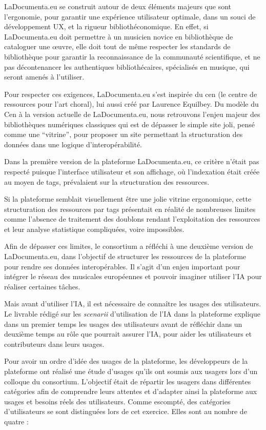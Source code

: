 LaDocumenta.eu se construit autour de deux éléments majeurs que sont l'ergonomie, pour garantir une expérience utilisateur optimale, dans un souci de développement UX, et la rigueur bibliothéconomique. En effet, si LaDocumenta.eu doit permettre à un musicien novice en bibliothèque de cataloguer une œuvre, elle doit tout de même respecter les standards de bibliothèque pour garantir la reconnaissance de la communauté scientifique, et ne pas décontenancer les authentiques bibliothécaires, spécialisés en musique, qui seront amenés à l'utiliser. 

Pour respecter ces exigences, LaDocumenta.eu s'est inspirée du cen (le centre de ressources  pour l'art choral), lui aussi créé par Laurence Equilbey.
Du modèle du Cen à la version actuelle de LaDocumenta.eu, nous retrouvons l'enjeu majeur des bibliothèques numériques classiques qui est de dépasser le simple site joli, pensé comme une \enquote{vitrine}, pour proposer un site permettant la structuration des données dans une logique d'interopérabilité. 

Dans la première version de la plateforme LaDocumenta.eu, ce critère n'était pas respecté puisque l'interface utilisateur et son affichage, où l'indexation était créée au moyen de tags, prévalaient sur la structuration des ressources. 

Si la plateforme semblait visuellement être une jolie vitrine ergonomique, cette structuration des ressources par tags présentait en réalité de nombreuses limites comme l'absence de traitement des doublons rendant l'exploitation des ressources et leur analyse statistique compliquées, voire impossibles.

Afin de dépasser ces limites, le consortium a réfléchi à une deuxième version de LaDocumenta.eu, dans l'objectif de structurer les ressources de la plateforme pour rendre ses données interopérables.
Il s'agit d'un enjeu important pour intégrer le réseau des musicales européennes et pouvoir imaginer utiliser l'IA pour réaliser certaines tâches.

Mais avant d'utiliser l'IA, il est nécessaire de connaître les usages des utilisateurs. Le livrable rédigé sur les \textit{scenarii} d'utilisation de l'IA dans la plateforme explique dans un premier temps les usages des utilisateurs avant de réfléchir dans un deuxième temps au rôle que pourrait assurer l'IA, pour aider les utilisateurs et contributeurs dans leurs usages.

Pour avoir un ordre d'idée des usages de la plateforme, les développeurs de la plateforme ont réalisé une étude d’usages qu’ils ont soumis aux usagers  lors d’un colloque du consortium. L'objectif était de répartir les usagers dans différentes catégories afin de comprendre leurs attentes et d'adapter ainsi la plateforme aux usages et besoins réels des utilisateurs. 
Comme escompté, des catégories d’utilisateurs se sont distinguées lors de cet exercice. Elles sont au nombre de quatre : 

